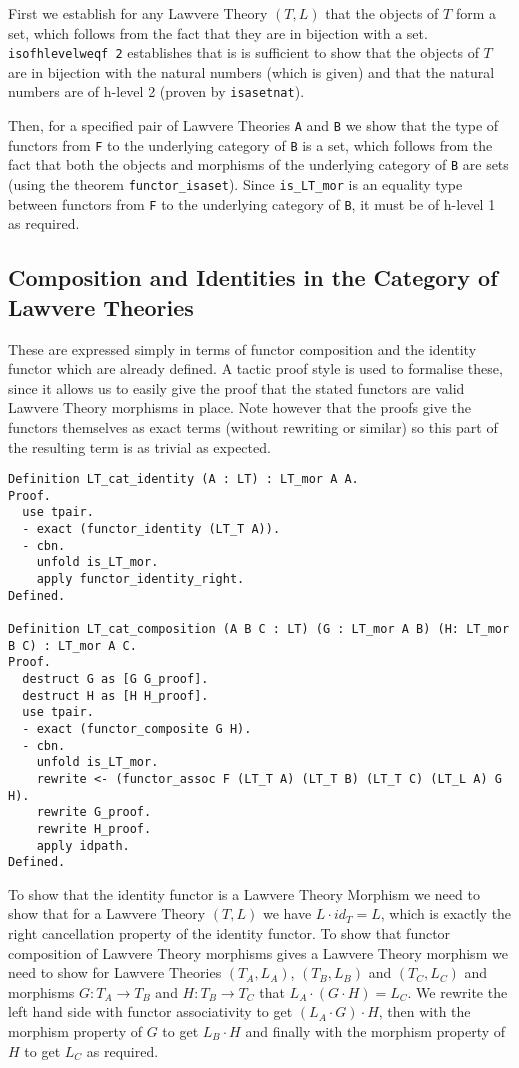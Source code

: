 First we establish for any Lawvere Theory $(T, L)$ that the objects of $T$ form
a set, which follows from the fact that they are in bijection with a set.
\verb|isofhlevelweqf 2| establishes that is is sufficient to show that the
objects of $T$ are in bijection with the natural numbers (which is given) and
that the natural numbers are of h-level 2 (proven by \verb|isasetnat|).

Then, for a specified pair of Lawvere Theories \verb|A| and \verb|B| we show
that the type of functors from \verb|F| to the underlying category of \verb|B|
is a set, which follows from the fact that both the objects and morphisms of the
underlying category of \verb|B| are sets (using the theorem
\verb|functor_isaset|). Since \verb|is_LT_mor| is an equality type between
functors from \verb|F| to the underlying category of \verb|B|, it must be of
h-level 1 as required.

\subsection{Composition and Identities in the Category of Lawvere Theories}
These are expressed simply in terms of functor composition and the identity
functor which are already defined. A tactic proof style is used to formalise
these, since it allows us to easily give the proof that the stated functors are
valid Lawvere Theory morphisms in place. Note however that the proofs give the
functors themselves as exact terms (without rewriting or similar) so this part
of the resulting term is as trivial as expected.
\begin{lstlisting}
Definition LT_cat_identity (A : LT) : LT_mor A A.
Proof.
  use tpair.
  - exact (functor_identity (LT_T A)).
  - cbn.
    unfold is_LT_mor.
    apply functor_identity_right.
Defined.

Definition LT_cat_composition (A B C : LT) (G : LT_mor A B) (H: LT_mor B C) : LT_mor A C.
Proof.
  destruct G as [G G_proof].
  destruct H as [H H_proof].
  use tpair.
  - exact (functor_composite G H).
  - cbn.
    unfold is_LT_mor.
    rewrite <- (functor_assoc F (LT_T A) (LT_T B) (LT_T C) (LT_L A) G H).
    rewrite G_proof.
    rewrite H_proof.
    apply idpath.
Defined.
\end{lstlisting}

To show that the identity functor is a Lawvere Theory Morphism we need to show
that for a Lawvere Theory $(T, L)$ we have $L\cdot id_T = L$, which is exactly
the right cancellation property of the identity functor. To show that functor
composition of Lawvere Theory morphisms gives a Lawvere Theory morphism we need
to show for Lawvere Theories $(T_A, L_A)$, $(T_B, L_B)$ and $(T_C, L_C)$
and morphisms $G: T_A\to T_B$ and $H: T_B\to T_C$ that $L_A\cdot (G\cdot H) =
L_C$. We rewrite the left hand side with functor associativity to get $(L_A\cdot
G)\cdot H$, then with the morphism property of $G$ to get $L_B\cdot H$ and
finally with the morphism property of $H$ to get $L_C$ as required.

